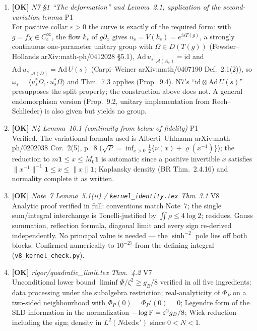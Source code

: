 \documentclass[11pt]{article}
\begin{document}
\begin{enumerate}[leftmargin=1.6em,itemsep=6pt]
\item \textbf{[OK]} \emph{N7 \S1 ``The deformation'' and Lemma~2.1; application of the second-variation lemma} \hfill\textsc{P1}\\ For positive collar \(\varepsilon>0\) the curve is exactly of the required form: with \(g=f\chi\in C^\infty_c\), the flow \(k_s\) of \(g\partial_x\) gives \(u_s=V(k_s)=e^{isT(g)}\), a strongly continuous one-parameter unitary group with \(\Omega\in D(T(g))\) (Fewster--Hollands arXiv:math-ph/0412028 \S5.1), \(\mathrm{Ad}\,u_s|_{\mathcal A(A_\varepsilon)}=\mathrm{id}\) and \(\mathrm{Ad}\,u_s|_{\mathcal A(D)}=\mathrm{Ad}\,U(s)\) (Carpi--Weiner arXiv:math/0407190 Def.~2.1(2)), so \(\widetilde\omega_\varepsilon=\langle u_s^*\Omega,\cdot\,u_s^*\Omega\rangle\) and Thm.~7.3 applies (Prop.~9.4). N7's ``\(\mathrm{id}\otimes\mathrm{Ad}\,U(s)\)'' presupposes the split property; the construction above does not. A general endomorphism version (Prop.~9.2, unitary implementation from Reeh--Schlieder) is also given but yields no group.
\item \textbf{[OK]} \emph{N4 Lemma~10.1 (continuity from below of fidelity)} \hfill\textsc{P1}\\ Verified. The variational formula used is Alberti--Uhlmann arXiv:math-ph/0202038 Cor.~2(5), p.~8 (\(\sqrt{P}=\inf_{x>0}\frac12\{\nu(x)+\varrho(x^{-1})\}\)); the reduction to \(m\mathbf 1\le x\le M_0\mathbf 1\) is automatic since a positive invertible \(x\) satisfies \(\|x^{-1}\|^{-1}\mathbf 1\le x\le\|x\|\mathbf 1\); Kaplansky density (BR Thm.~2.4.16) and normality complete it as written.
\item \textbf{[OK]} \emph{Note~7 Lemma~5.1(ii) / \texttt{kernel\_identity.tex} Thm~3.1} \hfill\textsc{V8}\\ Analytic proof verified in full: conventions match Note~7; the single sum/integral interchange is Tonelli-justified by \(\iint\rho\le4\log2\); residues, Gauss summation, reflection formula, diagonal limit and every sign re-derived independently. No principal value is needed --- the \(\sinh^{-2}\) pole lies off both blocks. Confirmed numerically to \(10^{-27}\) from the defining integral (\texttt{v8\_kernel\_check.py}).
\item \textbf{[OK]} \emph{rigor/quadratic\_limit.tex Thm.~4.2} \hfill\textsc{V7}\\ Unconditional lower bound \(\liminf\Phi/\zeta^2\ge g_B/8\) verified in all five ingredients: data processing under the subalgebra restriction; real-analyticity of \(\Phi_P\) on a two-sided neighbourhood with \(\Phi_P(0)=\Phi_P'(0)=0\); Legendre form of the SLD information in the normalization \(-\log\operatorname{F}=\varepsilon^2g_B/8\); Wick reduction including the sign; density in \(L^2(N\mathrm d\kappa\mathrm d\kappa')\) since \(0<N<1\).

\end{enumerate}
\end{document}
